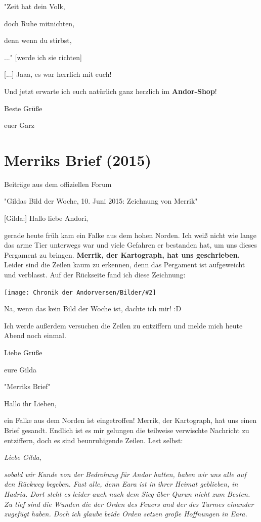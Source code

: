 \documentclass[10pt, a4paper, oneside]{book}
\newcommand{\fillbreak}{\vspace*{\fill}\columnbreak}
\newcommand{\storytext}[1]{%
    \section{#1}%
    \label{Storytext: #1}%
}
\newcommand{\bildmitts}[2][height=0.32\textwidth,width=0.48\textwidth,keepaspectratio]{%
    \begin{center}
        \texttt{[image: Chronik der Andorversen/Bilder/\#2]}
    \end{center}
}
\begin{document}
\begin{multicols}{2}
"Zeit hat dein Volk,

doch Ruhe mitnichten,

denn wenn du stirbst,

..." [werde ich sie richten] 

[...] Jaaa, es war herrlich mit euch!

Und jetzt erwarte ich euch natürlich ganz herzlich im \textbf{Andor-Shop}!


Beste Grüße

euer Garz







\fillbreak
\storytext{Merriks Brief (2015)}


\begin{center}
    Beiträge aus dem offiziellen Forum
    
    "Gildas Bild der Woche, 10. Juni 2015: Zeichnung von Merrik"
\end{center}


[Gilda:] Hallo liebe Andori,

gerade heute früh kam ein Falke aus dem hohen Norden. Ich weiß nicht wie lange das arme Tier unterwegs war und viele Gefahren er bestanden hat, um uns dieses Pergament zu bringen. \textbf{Merrik, der Kartograph, hat uns geschrieben.} Leider sind die Zeilen kaum zu erkennen, denn das Pergament ist aufgeweicht und verblasst. Auf der Rückseite fand ich diese Zeichnung:

\bildmitts{Merriks Brief.jpeg}

Na, wenn das kein Bild der Woche ist, dachte ich mir! :D

Ich werde außerdem versuchen die Zeilen zu entziffern und melde mich heute Abend noch einmal.

Liebe Grüße

eure Gilda

\begin{center}
    "Merriks Brief"
\end{center}

Hallo ihr Lieben,

ein Falke aus dem Norden ist eingetroffen! Merrik, der Kartograph, hat uns einen Brief gesandt. Endlich ist es mir gelungen die teilweise verwischte Nachricht zu entziffern, doch es sind beunruhigende Zeilen. Lest selbst:

\textit{Liebe Gilda,}

\textit{sobald wir Kunde von der Bedrohung für Andor hatten, haben wir uns alle auf den Rückweg begeben. Fast alle, denn Eara ist in ihrer Heimat geblieben, in Hadria. Dort steht es leider auch nach dem Sieg über Qurun nicht zum Besten. Zu tief sind die Wunden die der Orden des Feuers und der des Turmes einander zugefügt haben. Doch ich glaube beide Orden setzen große Hoffnungen in Eara.}


\end{multicols}
\end{document}

